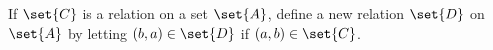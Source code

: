 \documentclass[../main.tex]{subfiles}
\begin{document}
\problem{}\label{s3p14}

If \(\set{C}\) is a relation on a set \(\set{A}\), define a new relation
\(\set{D}\) on \(\set{A}\) by letting \((b,a)\in\set{D}\) if
\((a,b)\isin\set{C}\).




\end{document}

